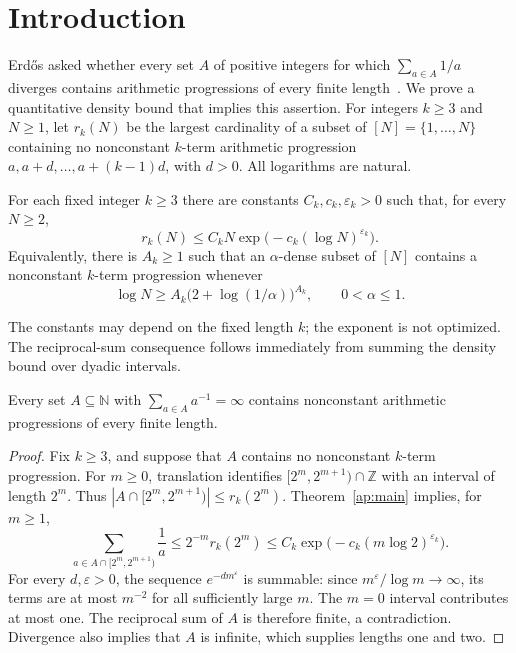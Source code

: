 \section{Introduction}\label{ap:introduction}

Erd\H{o}s asked whether every set $A$ of positive integers for which
$\sum_{a\in A}1/a$ diverges contains arithmetic progressions of every
finite length~\cite[Problem~4.33.6]{Erdos1974}.
We prove a quantitative density bound that implies this assertion.
For integers $k\ge3$ and $N\ge1$, let $r_k(N)$ be the largest
cardinality of a subset of $[N]=\{1,\ldots,N\}$ containing no
nonconstant $k$-term arithmetic progression
$a,a+d,\ldots,a+(k-1)d$, with $d>0$.
All logarithms are natural.

\begin{theorem}\label{ap:main}
For each fixed integer $k\ge3$ there are constants
$C_k,c_k,\varepsilon_k>0$ such that, for every $N\ge2$,
\begin{equation}\label{ap:density-bound}
 r_k(N)\le C_kN\exp\bigl(-c_k(\log N)^{\varepsilon_k}\bigr).
\end{equation}
Equivalently, there is $A_k\ge1$ such that an $\alpha$-dense subset
of $[N]$ contains a nonconstant $k$-term progression whenever
\begin{equation}\label{ap:threshold}
 \log N\ge A_k\bigl(2+\log(1/\alpha)\bigr)^{A_k},
 \qquad 0<\alpha\le1.
\end{equation}
\end{theorem}


The constants may depend on the fixed length $k$; the exponent is
not optimized. The reciprocal-sum consequence follows immediately
from summing the density bound over dyadic intervals.

\begin{corollary}\label{ap:reciprocal}
Every set $A\subseteq\mathbb N$ with
$\sum_{a\in A}a^{-1}=\infty$ contains nonconstant arithmetic
progressions of every finite length.
\end{corollary}

\begin{proof}
Fix $k\ge3$, and suppose that $A$ contains no nonconstant
$k$-term progression. For $m\ge0$, translation identifies
$[2^m,2^{m+1})\cap\mathbb Z$ with an interval of length $2^m$.
Thus $|A\cap[2^m,2^{m+1})|\le r_k(2^m)$. Theorem~\ref{ap:main}
implies, for $m\ge1$,
\[
 \sum_{a\in A\cap[2^m,2^{m+1})}\frac1a
 \le 2^{-m}r_k(2^m)
 \le C_k\exp\bigl(-c_k(m\log2)^{\varepsilon_k}\bigr).
\]
For every $d,\varepsilon>0$, the sequence $e^{-dm^\varepsilon}$
is summable: since $m^\varepsilon/\log m\to\infty$, its terms
are at most $m^{-2}$ for all sufficiently large $m$.
The $m=0$ interval contributes at most one. The reciprocal sum of
$A$ is therefore finite, a contradiction. Divergence also implies
that $A$ is infinite, which supplies lengths one and two.
\end{proof}

